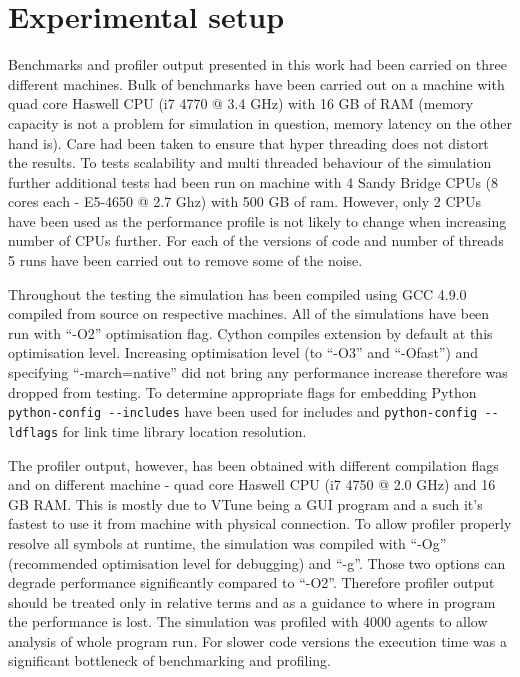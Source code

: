 \documentclass[12pt, a4paper]{report}
\begin{document}
\section{Experimental setup}\label{sec:exp-setup}

Benchmarks and profiler output presented in this work had been carried
on three different machines. Bulk of benchmarks have been carried
out on a machine with quad core Haswell CPU (i7 4770 @ 3.4 GHz) with
16 GB of RAM (memory capacity is not a problem for simulation in
question, memory latency on the other hand is). Care
had been taken to ensure that hyper threading does not distort the results.
To tests scalability and multi threaded behaviour of the simulation further
additional tests had been run on machine with 4 Sandy Bridge CPUs
(8 cores each - E5-4650 @ 2.7 Ghz) with 500 GB of ram. However, only 2 CPUs
have been used as the performance profile is not likely to change when
increasing number of CPUs further. For each of the versions of code and
number of threads 5 runs have been carried out to remove some of the noise.

Throughout the testing the simulation has been compiled using GCC 4.9.0
compiled from source on respective machines. All of the simulations have
been run with ``-O2'' optimisation flag. Cython compiles extension by
default at this optimisation level. Increasing optimisation level
(to ``-O3'' and ``-Ofast'') and specifying ``-march=native'' did not bring
any performance increase therefore was dropped from testing. To determine
appropriate flags for embedding Python \lstinline{python-config --includes}
have been used for includes and \lstinline{python-config --ldflags} for
link time library location resolution.

The profiler output, however, has been obtained with different compilation
flags and on different machine - quad core Haswell CPU (i7 4750 @ 2.0 GHz)
and 16 GB RAM. This is mostly due to VTune being a GUI program and a such it's
fastest to use it from machine with physical connection.
To allow profiler properly resolve all symbols at runtime, the simulation
was compiled with ``-Og'' (recommended optimisation level for debugging)
and ``-g''. Those two options can degrade performance significantly compared
to ``-O2''. Therefore profiler output should be treated only in relative
terms and as a guidance to where in program the performance is lost. The
simulation was profiled with 4000 agents to allow analysis of whole program
run. For slower code versions the execution time was a significant bottleneck
of benchmarking and profiling.
\end{document}
